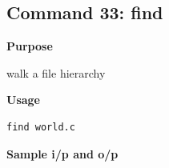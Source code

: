 \subsection{Command 33: find} 
\textbf{Purpose}
\begin{flushleft}
 walk a file hierarchy
\end{flushleft}
\textbf{Usage}
\begin{verbatim}
find world.c
\end{verbatim}
\textbf{Sample i/p and o/p}
\begin{figure}[H] 
\end{figure}
